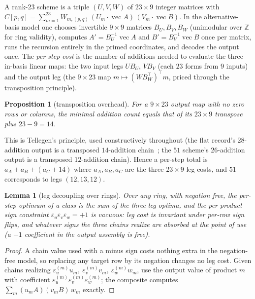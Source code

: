 \documentclass[11pt]{article}
\newtheorem{lemma}[theorem]{Lemma}
\newtheorem{proposition}[theorem]{Proposition}
\theoremstyle{definition}
\theoremstyle{remark}
\newcommand{\Z}{\mathbb{Z}}
\newcommand{\eps}{\varepsilon}
\begin{document}
A rank-23 scheme is a triple $(U,V,W)$ of $23\times9$ integer
matrices with
$C[p,q]=\sum_{m=1}^{23} W_{m,(p,q)}\,(U_m\!\cdot\!\operatorname{vec}A)\,
(V_m\!\cdot\!\operatorname{vec}B)$.
In the alternative-basis model one chooses invertible $9\times9$
matrices $B_U,B_V,B_W$ (unimodular over $\Z$ for ring validity),
computes $A'=B_U^{-1}\operatorname{vec}A$ and
$B'=B_V^{-1}\operatorname{vec}B$ once per matrix, runs the recursion
entirely in the primed coordinates, and decodes the output once.  The
\emph{per-step cost} is the number of additions needed to evaluate the
three in-basis linear maps: the two input legs $U\!B_U$, $V\!B_V$
(each $23$ forms from $9$ inputs) and the output leg (the $9\times23$
map $m\mapsto (WB_W^{\!\top})^{\!\top} m$, priced through the
transposition principle).

\begin{proposition}[transposition overhead]\label{prop:tellegen}
For a $9\times23$ output map with no zero rows or columns, the minimal
addition count equals that of its $23\times9$ transpose plus
$23-9=14$.
\end{proposition}

This is Tellegen's principle, used constructively throughout (the
flat record's $28$-addition output is a transposed $14$-addition
chain~\cite{Sidebottom26,KI26}; the $51$ scheme's $26$-addition output
is a transposed $12$-addition chain).  Hence a per-step total is
$a_A+a_B+(a_C+14)$ where $a_A,a_B,a_C$ are the three $23\times9$ leg
costs, and $51$ corresponds to legs $(12,13,12)$.

\begin{lemma}[leg decoupling over rings]\label{lem:decouple}
Over any ring, with negation free, the per-step optimum of a class is
the sum of the three leg optima, and the per-product sign constraint
$\eps_u\eps_v\eps_w=+1$ is vacuous: leg cost is invariant under
per-row sign flips, and whatever signs the three chains realize are
absorbed at the point of use (a $-1$ coefficient in the output
assembly is free).
\end{lemma}

\begin{proof}
A chain value used with a minus sign costs nothing extra in the
negation-free model, so replacing any target row by its negation
changes no leg cost.  Given chains realizing
$\eps_u^{(m)}u_m,\ \eps_v^{(m)}v_m,\ \eps_w^{(m)}w_m$, use the output
value of product $m$ with coefficient
$\eps_u^{(m)}\eps_v^{(m)}\eps_w^{(m)}$; the composite computes
$\sum_m (u_m A)(v_m B)\,w_m$ exactly.
\end{proof}
\end{document}
